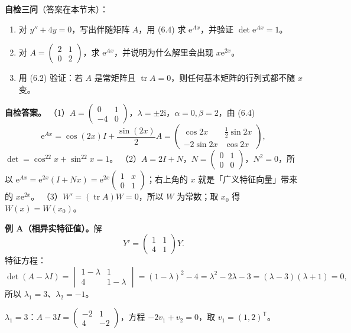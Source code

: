 \documentclass[11pt]{ctexart}
\newcommand{\tr}{\operatorname{tr}}
\newcommand{\ii}{\mathrm{i}}
\newcommand{\ee}{\mathrm{e}}
\begin{document}
\textbf{自检三问}（答案在本节末）：
\begin{enumerate}
  \item 对 $y''+4y=0$，写出伴随矩阵 $A$，用 (6.4) 求 $\ee^{Ax}$，并验证 $\det\ee^{Ax}=1$。
  \item 对 $A=\begin{pmatrix}2&1\\0&2\end{pmatrix}$，求 $\ee^{Ax}$，并说明为什么解里会出现 $x\ee^{2x}$。
  \item 用 (6.2) 验证：若 $A$ 是常矩阵且 $\tr A=0$，则任何基本矩阵的行列式都不随 $x$ 变。
\end{enumerate}

\textbf{自检答案。}
（1）$A=\begin{pmatrix}0&1\\-4&0\end{pmatrix}$，$\lambda=\pm2\ii$，$\alpha=0,\beta=2$，由 (6.4)
\[
\ee^{Ax}=\cos(2x)I+\frac{\sin(2x)}{2}A
=\begin{pmatrix}\cos2x&\frac12\sin2x\\-2\sin2x&\cos2x\end{pmatrix},
\]
$\det=\cos^22x+\sin^22x=1$。
（2）$A=2I+N$，$N=\begin{pmatrix}0&1\\0&0\end{pmatrix}$，$N^2=0$，所以 $\ee^{Ax}=\ee^{2x}(I+Nx)=\ee^{2x}\begin{pmatrix}1&x\\0&1\end{pmatrix}$；右上角的 $x$ 就是「广义特征向量」带来的 $x\ee^{2x}$。
（3）$W'=(\tr A)W=0$，所以 $W$ 为常数；取 $x_0$ 得 $W(x)=W(x_0)$。


\textbf{例 A（相异实特征值）。}解
\[
Y'=\begin{pmatrix}1&1\\4&1\end{pmatrix}Y .
\]
特征方程：
\[
\det(A-\lambda I)=\begin{vmatrix}1-\lambda&1\\4&1-\lambda\end{vmatrix}
=(1-\lambda)^2-4=\lambda^2-2\lambda-3=(\lambda-3)(\lambda+1)=0,
\]
所以 $\lambda_1=3$、$\lambda_2=-1$。

$\lambda_1=3$：$A-3I=\begin{pmatrix}-2&1\\4&-2\end{pmatrix}$，方程 $-2v_1+v_2=0$，取 $v_1=(1,2)^{\mathsf T}$。
\end{document}
